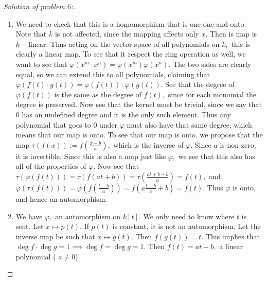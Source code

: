 \documentclass[letterpaper,11pt,twoside]{article}
\theoremstyle{proposition}
\theoremstyle{definition}
\theoremstyle{theorem}
\theoremstyle{definition}
\theoremstyle{definition}
\theoremstyle{definition}
\theoremstyle{lemma}
\theoremstyle{definition}
\theoremstyle{definition}
\theoremstyle{corollary}
\theoremstyle{definition}
\theoremstyle{definition}
\theoremstyle{definition}
\begin{document}
	\begin{proof}[Solution of problem $6$:]
	\begin{enumerate}
		\item We need to check that this is a homomorphism that is one-one and onto. Note that $k$ is not affected, since the mapping affects only $x.$ Then 
		is map is $k-$linear. Thus acting on the vector space of all polynomials on $k,$ this is clearly a linear map. To see that it respect the ring 
		operation as well, we want to see that $\varphi( x^m \cdot x^n ) = \varphi(x^m)\varphi(x^n).$ The two sides are clearly equal, so we can extend this 
		to all polynomials, claiming that $\varphi(f(t)\cdot g(t))= \varphi(f(t))\cdot \varphi(g(t)).$ See that the degree of $\varphi(f(t))$ is the same as 
		the degree of $f(t),$ since for each monomial the degree is preserved. Now see that the kernel must be trivial, since we say that $0$ has an 
		undefined degree and it is the only such element. Thus any polynomial that goes to $0$ under $\varphi$ must also have that same degree, which means 
		that our map is onto. To see that our map is onto, we propose that the map $\tau(f(x)):= f\left(\frac{x-b}{a}\right),$ which is the inverse of 
		$\varphi.$ Since $a$ is non-zero, it is invertible. Since this is also a map just like $\varphi,$ we see that this also has all of the properties of 
		$\varphi.$ Now see that $\tau ( \varphi(f(t)))= \tau( f(at+b))= \tau \left( \frac{at+b-b}{a}\right)=f(t),$ and $ \varphi( \tau(f(t)) ) = \varphi 
		\left( f\left( \frac{t-b}{a}\right) \right)= f\left( a\frac{t-b}{a}+b \right)=f(t).$ Thus $\varphi$ is onto, and hence an automorphism.
		
		\item We have $\varphi,$ an automorphism on $k[t].$ We only need to know where $t$ is sent. Let $x \mapsto p(t).$ If $p(t)$ is constant, it is not 
		an automorphism. Let the inverse map be such that $x \mapsto g(t).$ Then $f(g(t))=t.$ This implies that $\deg f \cdot \deg g=1 \implies \deg f= \deg 
		g=1.$ Then $f(t)=at+b,$ a linear polynomial ( $a \neq 0$). 
	\end{enumerate}
\end{proof}
\end{document}
